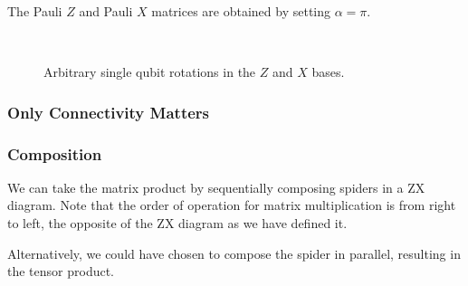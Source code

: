 The Pauli $Z$ and Pauli $X$ matrices are obtained by setting $\alpha = \pi$.
\begin{figure}[H]
\centering
{} \\[1ex]
\caption{Arbitrary single qubit rotations in the $Z$ and $X$ bases.}
\end{figure}


\subsubsection{Only Connectivity Matters}


\subsubsection{Composition}
We can take the matrix product by sequentially composing spiders in a ZX diagram. Note that the order of operation for matrix multiplication is from right to left, the opposite of the ZX diagram as we have defined it.

\begin{figure}[H]
    \centering
\end{figure}

Alternatively, we could have chosen to compose the spider in parallel, resulting in the tensor product.
\begin{figure}[H]
    \centering
\end{figure}

